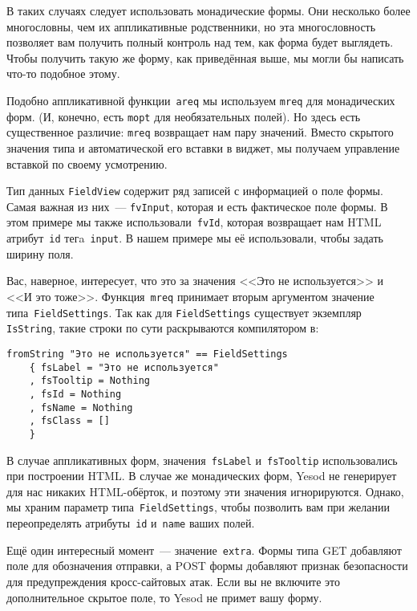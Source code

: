 В таких случаях следует использовать монадические формы. Они несколько более
многословны, чем их аппликативные родственники, но эта многословность
позволяет вам получить полный контроль над тем, как форма будет выглядеть.
Чтобы получить такую же форму, как приведённая выше, мы могли бы написать
что-то подобное этому.


Подобно аппликативной функции~\lstinline'areq' мы используем \lstinline'mreq'
для монадических форм.  (И, конечно, есть \lstinline'mopt' для необязательных
полей).  Но здесь есть существенное различие: \lstinline'mreq' возвращает нам
пару значений.  Вместо скрытого значения типа
и автоматической его вставки в виджет, мы получаем управление вставкой по
своему усмотрению.

Тип данных \lstinline'FieldView' содержит ряд записей с информацией о поле
формы. Самая важная из них~--- \lstinline'fvInput', которая и есть фактическое
поле формы. В этом примере мы также использовали~\lstinline'fvId', которая
возвращает нам HTML атрибут~\texttt{id} тегa~\texttt{input}. В нашем примере
мы её использовали, чтобы задать ширину поля.

Вас, наверное, интересует, что это за значения <<Это не используется>> и <<И это
тоже>>.  Функция~\lstinline'mreq' принимает вторым аргументом значение
типа~\lstinline'FieldSettings'.  Так как для \lstinline'FieldSettings'
существует экземпляр \lstinline'IsString', такие строки по сути раскрываются
компилятором в:

\begin{lstlisting}
fromString "Это не используется" == FieldSettings
    { fsLabel = "Это не используется"
    , fsTooltip = Nothing
    , fsId = Nothing
    , fsName = Nothing
    , fsClass = []
    }
\end{lstlisting}

В случае аппликативных форм, значения~\lstinline'fsLabel'
и~\lstinline'fsTooltip' использовались при построении HTML. В случае же
монадических форм, Yesod не генерирует для нас никаких HTML-обёрток, и поэтому
эти значения игнорируются. Однако, мы храним параметр
типа~\lstinline'FieldSettings', чтобы позволить вам при желании переопределять
атрибуты~\texttt{id} и~\texttt{name} ваших полей.

Ещё один интересный момент~--- значение~\lstinline{extra}. Формы типа GET
добавляют поле для обозначения отправки, а POST формы добавляют признак
безопасности для предупреждения кросс-сайтовых атак.  Если вы не включите это
дополнительное скрытое поле, то Yesod не примет вашу форму.

